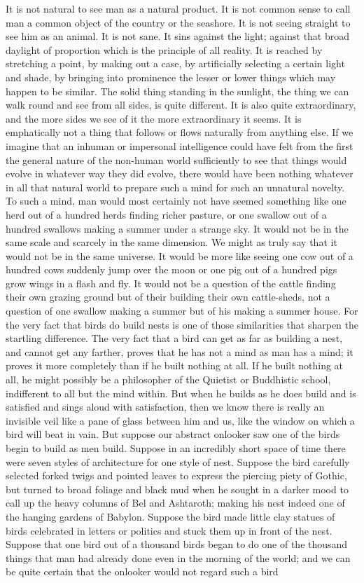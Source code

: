 It is not natural to see man as a natural product. It is not common sense to call man a common object of the country or the seashore. It is not seeing straight to see him as an animal. It is not sane. It sins against the light; against that broad daylight of proportion which is the principle of all reality. It is reached by stretching a point, by making out a case, by artificially selecting a certain light and shade, by bringing into prominence the lesser or lower things which may happen to be similar. The solid thing standing in the sunlight, the thing we can walk round and see from all sides, is quite different. It is also quite extraordinary, and the more sides we see of it the more extraordinary it seems. It is emphatically not a thing that follows or flows naturally from anything else. If we imagine that an inhuman or impersonal intelligence could have felt from the first the general nature of the non-human world sufficiently to see that things would evolve in whatever way they did evolve, there would have been nothing whatever in all that natural world to prepare such a mind for such an unnatural novelty. To such a mind, man would most certainly not have seemed something like one herd out of a hundred herds finding richer pasture, or one swallow out of a hundred swallows making a summer under a strange sky. It would not be in the same scale and scarcely in the same dimension. We might as truly say that it would not be in the same universe. It would be more like seeing one cow out of a hundred cows suddenly jump over the moon or one pig out of a hundred pigs grow wings in a flash and fly. It would not be a question of the cattle finding their own grazing ground but of their building their own cattle-sheds, not a question of one swallow making a summer but of his making a summer house. For the very fact that birds do build nests is one of those similarities that sharpen the startling difference. The very fact that a bird can get as far as building a nest, and cannot get any farther, proves that he has not a mind as man has a mind; it proves it more completely than if he built nothing at all. If he built nothing at all, he might possibly be a philosopher of the Quietist or Buddhistic school, indifferent to all but the mind within. But when he builds as he does build and is satisfied and sings aloud with satisfaction, then we know there is really an invisible veil like a pane of glass between him and us, like the window on which a bird will beat in vain. But suppose our abstract onlooker saw one of the birds begin to build as men build. Suppose in an incredibly short space of time there were seven styles of architecture for one style of nest. Suppose the bird carefully selected forked twigs and pointed leaves to express the piercing piety of Gothic, but turned to broad foliage and black mud when he sought in a darker mood to call up the heavy columns of Bel and Ashtaroth; making his nest indeed one of the hanging gardens of Babylon. Suppose the bird made little clay statues of birds celebrated in letters or politics and stuck them up in front of the nest. Suppose that one bird out of a thousand birds began to do one of the thousand things that man had already done even in the morning of the world; and we can be quite certain that the onlooker would not regard such a bird 